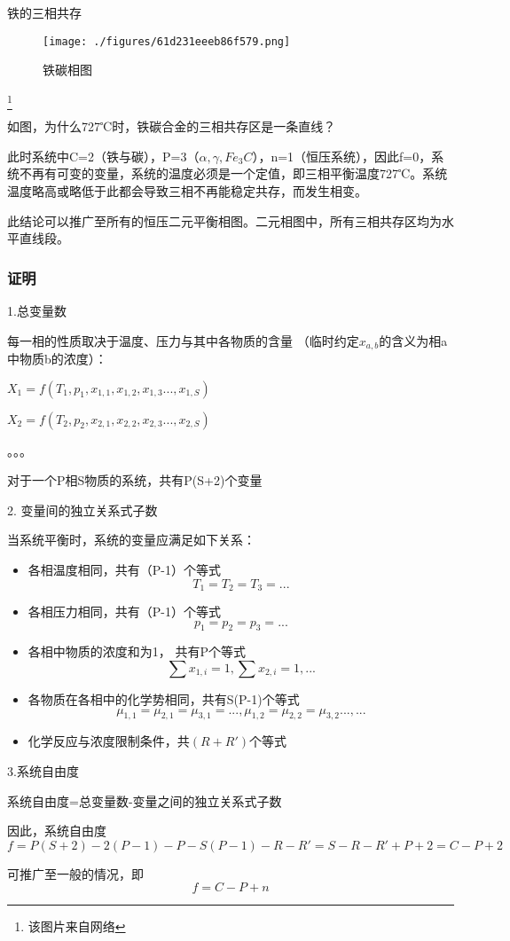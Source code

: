 \begin{example}{铁的三相共存}
\begin{figure}[ht]
\centering
\texttt{[image: ./figures/61d231eeeb86f579.png]}
\caption{铁碳相图} \label{fig_GBPL_1}
\end{figure}
\footnote{该图片来自网络}

如图，为什么727℃时，铁碳合金的三相共存区是一条直线？

此时系统中C=2（铁与碳），P=3（$\alpha, \gamma, Fe_3C$），n=1（恒压系统），因此f=0，系统不再有可变的变量，系统的温度必须是一个定值，即三相平衡温度727℃。系统温度略高或略低于此都会导致三相不再能稳定共存，而发生相变。

此结论可以推广至所有的恒压二元平衡相图。二元相图中，所有三相共存区均为水平直线段。
\end{example}

\subsubsection{证明}
1.总变量数

每一相的性质取决于温度、压力与其中各物质的含量 （临时约定$x_{a,b}$的含义为相a中物质b的浓度）：

$X_1=f(T_1, p_1,x_{1,1},x_{1,2},x_{1,3}...,x_{1,S})$

$X_2=f(T_2,p_2,x_{2,1},x_{2,2},x_{2,3}...,x_{2,S})$

。。。

对于一个P相S物质的系统，共有P(S+2)个变量

2. 变量间的独立关系式子数

当系统平衡时，系统的变量应满足如下关系：

\begin{itemize}
\item 各相温度相同，共有（P-1）个等式
\begin{equation}
T_1=T_2=T_3=...
\end{equation}
\item 各相压力相同，共有（P-1）个等式
\begin{equation}
p_1=p_2=p_3=...
\end{equation}
\item 各相中物质的浓度和为1， 共有P个等式
\begin{equation}
\sum x_{1,i} = 1, \sum x_{2,i} = 1, ...
\end{equation}
\item 各物质在各相中的化学势相同，共有S(P-1)个等式
\begin{equation}
\mu_{1,1}=\mu_{2,1}=\mu_{3,1}=..., \mu_{1,2}=\mu_{2,2}=\mu_{3,2}..., ...
\end{equation}
\item 化学反应与浓度限制条件，共$(R+R')$个等式
\end{itemize}

3.系统自由度

系统自由度=总变量数-变量之间的独立关系式子数

因此，系统自由度 
\begin{equation}
f = P(S+2) - 2(P-1) - P - S(P-1)-R-R'=S-R-R'+P+2=C-P+2
\end{equation}

可推广至一般的情况，即
\begin{equation}
f = C-P+n
\end{equation}
